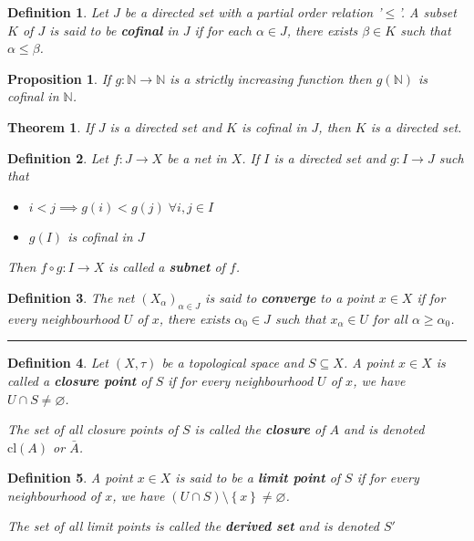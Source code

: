 \documentclass[14pt,twoside]{extreport}
\newcommand{\hhrule}{\vspace{1cm}\hrule\vspace{1cm}}
\theoremstyle{dotless}
\newtheorem*{defn}{Definition}
\newtheorem*{thm}{Theorem} %
\newtheorem*{prop}{Proposition} %
\begin{document}
\begin{defn}
    Let $J$ be a directed set with a partial order relation '$\leq$'. A subset $K$ of $J$ is said to be \textbf{cofinal} in $J$ if for each $\alpha \in J$, there exists $\beta \in K$ such that $\alpha \leq \beta$.
\end{defn}

\begin{prop}
    If $g \colon \mathbb{N} \to \mathbb{N}$ is a strictly increasing function then $g\left (\mathbb{N}\right )$ is cofinal in $\mathbb{N}$.
\end{prop}

\begin{thm}
    If $J$ is a directed set and $K$ is cofinal in $J$, then $K$ is a directed set.
\end{thm}

\begin{defn}
    Let $f \colon J \to X$ be a net in $X$. If $I$ is a directed set and $g \colon I \to J$ such that
    \begin{itemize}
        \item $i < j \implies g\left (i\right ) < g\left (j\right ) \;\forall i, j \in I$
        \item $g\left (I\right )$ is cofinal in $J$
    \end{itemize}
    Then $f \circ g \colon I \to X$ is called a \textbf{subnet} of $f$.
\end{defn}

\begin{defn}
    The net $\left (X_\alpha\right )_{\alpha \in J}$ is said to \textbf{converge} to a point $x \in X$ if for every neighbourhood $U$ of $x$, there exists $\alpha_0 \in J$ such that $x_\alpha \in U$ for all $\alpha \geq \alpha_0$.
\end{defn}

\hhrule 

\begin{defn}
    Let $\left (X, \tau\right )$ be a topological space and $S \subseteq X$. A point $x \in X$ is called a \textbf{closure point} of $S$ if for every neighbourhood $U$ of $x$, we have $U \cap S \neq  \varnothing$.

    The set of all closure points of $S$ is called the \textbf{closure} of $A$ and is denoted $\text{cl}\left (A\right )$ or $\bar{A}$.
\end{defn}

\begin{defn}
    A point $x \in X$ is said to be a \textbf{limit point} of $S$ if for every neighbourhood of $x$, we have $\left (U \cap S\right ) \setminus \left\{ x \right\} \neq  \varnothing $.

    The set of all limit points is called the \textbf{derived set} and is denoted $S'$
\end{defn}
\end{document}
